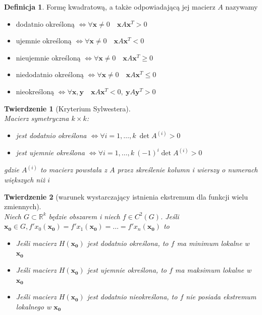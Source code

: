 \documentclass[12pt,a4paper]{article}
\newtheorem{tw}{Twierdzenie}
\theoremstyle{definition}
\newtheorem{df}{Definicja}
\begin{document}
\begin{df}
Formę kwadratową, a także odpowiadającą jej macierz $A$ nazywamy
\begin{itemize}
	\item dodatnio określoną $\Leftrightarrow \forall \mathbf{x}\neq 0 \quad \mathbf{x}A\mathbf{x}^T > 0$
	\item ujemnie określoną $\Leftrightarrow \forall \mathbf{x}\neq 0 \quad \mathbf{x}A\mathbf{x}^T < 0$
	\item nieujemnie określoną $\Leftrightarrow \forall \mathbf{x}\neq 0 \quad \mathbf{x}A\mathbf{x}^T \geqslant 0$
	\item niedodatnio określoną $\Leftrightarrow \forall \mathbf{x}\neq 0 \quad \mathbf{x}A\mathbf{x}^T \leqslant 0$	
	\item nieokreśloną $\Leftrightarrow \forall \mathbf{x,y} \quad \mathbf{x}A\mathbf{x}^T < 0,~ \mathbf{y}A\mathbf{y}^T > 0$
\end{itemize}
\end{df}

\begin{tw}[Kryterium Sylwestera]~\\
Macierz symetryczna $k\times k$:
\begin{itemize}
	\item jest dodatnio określona $\Leftrightarrow \forall i=1,\dots ,k ~ \det A^{(i)}>0$
	\item jest ujemnie określona $\Leftrightarrow \forall i=1,\dots ,k ~ (-1)^i\det A^{(i)}>0$
\end{itemize}
gdzie $A^{(i)}$ to macierz powstała z $A$ przez skreślenie kolumn i wierszy o numerach większych niż $i$
\end{tw}

\begin{tw}[warunek wystarczający istnienia ekstremum dla funkcji wielu zmiennych]~\\
Niech $G\subset \mathbb{R}^k$ będzie obszarem i niech $f\in C^2(G)$. Jeśli $\mathbf{x_0}\in G, f'x_0(\mathbf{x_0}) = f'x_1(\mathbf{x_0}) = \dots = f'x_n(\mathbf{x_0})$ to
\begin{itemize}
	\item Jeśli macierz $H(\mathbf{x_0})$ jest dodatnio określona, to $f$ ma minimum lokalne w $\mathbf{x_0}$
	\item Jeśli macierz $H(\mathbf{x_0})$ jest ujemnie określona, to $f$ ma maksimum lokalne w $\mathbf{x_0}$
	\item Jeśli macierz $H(\mathbf{x_0})$ jest dodatnio nieokreślona, to $f$ nie posiada ekstremum lokalnego w $\mathbf{x_0}$
\end{itemize}
\end{tw}
\end{document}
